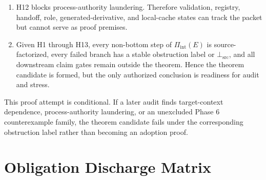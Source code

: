 \documentclass[11pt]{article}
\newcommand{\BottomSrc}{\bot_{\mathrm{src}}}
\begin{document}
\begin{enumerate}[leftmargin=*]
  source hypotheses or to fail closed with named obstruction labels.
  \item H12 blocks process-authority laundering. Therefore validation,
  registry, handoff, role, generated-derivative, and local-cache states can
  track the packet but cannot serve as proof premises.
  \item Given H1 through H13, every non-bottom step of
  \(\Pi_{\mathrm{int}}(E)\) is source-factorized, every failed branch has a
  stable obstruction label or \(\BottomSrc\), and all downstream claim gates
  remain outside the theorem. Hence the theorem candidate is formed, but the
  only authorized conclusion is readiness for audit and stress.
\end{enumerate}

This proof attempt is conditional. If a later audit finds target-context
dependence, process-authority laundering, or an unexcluded Phase 6
counterexample family, the theorem candidate fails under the corresponding
obstruction label rather than becoming an adoption proof.

\section{Obligation Discharge Matrix}
\end{document}
